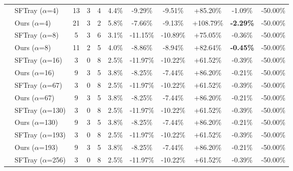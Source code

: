 \begin{table}[t]
{\begin{tabular}{ll|cccc|ccc|cc}
 & SFTray ($\alpha$=4) & 13 & 3 & 4 & 4.4\% & -9.29\% & -9.51\% & +85.20\% & -1.09\% & -50.00\% \\

 & Ours ($\alpha$=4) & 21 & 3 & 2 & 5.8\% & -7.66\% & -9.13\% & +108.79\% & \textbf{-2.29\%} & -50.00\% \\

\addlinespace[0.3em]

 & SFTray ($\alpha$=8) & 5 & 3 & 6 & 3.1\% & -11.15\% & -10.89\% & +75.05\% & -0.36\% & -50.00\% \\

 & Ours ($\alpha$=8) & 11 & 2 & 5 & 4.0\% & -8.86\% & -8.94\% & +82.64\% & \textbf{-0.45\%} & -50.00\% \\

\addlinespace[0.3em]

 & SFTray ($\alpha$=16) & 3 & 0 & 8 & 2.5\% & -11.97\% & -10.22\% & +61.52\% & -0.39\% & -50.00\% \\

 & Ours ($\alpha$=16) & 9 & 3 & 5 & 3.8\% & -8.25\% & -7.44\% & +86.20\% & -0.21\% & -50.00\% \\

\addlinespace[0.3em]

 & SFTray ($\alpha$=67) & 3 & 0 & 8 & 2.5\% & -11.97\% & -10.22\% & +61.52\% & -0.39\% & -50.00\% \\

 & Ours ($\alpha$=67) & 9 & 3 & 5 & 3.8\% & -8.25\% & -7.44\% & +86.20\% & -0.21\% & -50.00\% \\

\addlinespace[0.3em]

 & SFTray ($\alpha$=130) & 3 & 0 & 8 & 2.5\% & -11.97\% & -10.22\% & +61.52\% & -0.39\% & -50.00\% \\

 & Ours ($\alpha$=130) & 9 & 3 & 5 & 3.8\% & -8.25\% & -7.44\% & +86.20\% & -0.21\% & -50.00\% \\

\addlinespace[0.3em]

 & SFTray ($\alpha$=193) & 3 & 0 & 8 & 2.5\% & -11.97\% & -10.22\% & +61.52\% & -0.39\% & -50.00\% \\

 & Ours ($\alpha$=193) & 9 & 3 & 5 & 3.8\% & -8.25\% & -7.44\% & +86.20\% & -0.21\% & -50.00\% \\

\addlinespace[0.3em]

 & SFTray ($\alpha$=256) & 3 & 0 & 8 & 2.5\% & -11.97\% & -10.22\% & +61.52\% & -0.39\% & -50.00\% \\


\end{tabular}}
\end{table}
